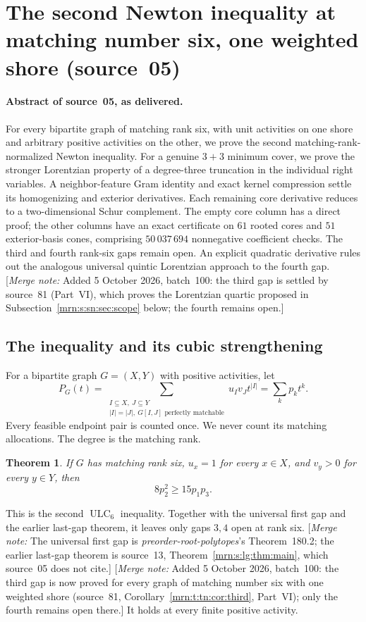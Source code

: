 \documentclass[11pt,a4paper]{article}
\newtheorem{theorem}{Theorem}[section]
\theoremstyle{remark}\newtheorem{remark}[theorem]{Remark}
\newcommand{\ULC}{\operatorname{ULC}}      %
\newcommand{\mnote}[1]{[\textit{Merge note:} #1]}
\newcommand{\prp}{\emph{preorder-root-polytopes}}
\begin{document}
\section{The second Newton inequality at matching number six, one weighted shore (source~05)}\label{mrn:src:05}
\paragraph{Abstract of source~05, as delivered.} For every bipartite graph of matching rank six, with unit activities on one shore
and arbitrary positive activities on the other, we prove the second
matching-rank-normalized Newton inequality. For a genuine $3+3$ minimum cover,
we prove the stronger Lorentzian property of a degree-three truncation in the
individual right variables. A neighbor-feature Gram identity and exact kernel
compression settle its homogenizing and exterior derivatives. Each remaining
core derivative reduces to a two-dimensional Schur complement. The empty core
column has a direct proof; the other columns have an exact certificate on
$61$ rooted cores and $51$ exterior-basis cones, comprising $50\,037\,694$
nonnegative coefficient checks. The third and fourth rank-six gaps remain open.
An explicit quadratic derivative rules out the analogous universal quintic
Lorentzian approach to the fourth gap.
\mnote{Added 5 October 2026, batch~100: the third gap is settled by source~81 (Part~VI), which
proves the Lorentzian quartic proposed in Subsection~\ref{mrn:s:sn:sec:scope}
below; the fourth remains open.}

\subsection{The inequality and its cubic strengthening}
For a bipartite graph $G=(X,Y)$ with positive activities, let
\[
 P_G(t)=\sum_{\substack{I\subseteq X,\ J\subseteq Y\\
 |I|=|J|,\ G[I,J]\text{ perfectly matchable}}}u_Iv_Jt^{|I|}
 =\sum_kp_kt^k.
\]
Every feasible endpoint pair is counted once. We never count its matching
allocations. The degree is the matching rank.

\begin{theorem}\label{mrn:s:sn:thm:main}
If $G$ has matching rank six, $u_x=1$ for every $x\in X$, and $v_y>0$ for every
$y\in Y$, then
\begin{equation}\label{mrn:s:sn:eq:gap2}
 8p_2^2\ge15p_1p_3.
\end{equation}
\end{theorem}
This is the second $\ULC_6$ inequality. Together with the universal first gap
and the earlier last-gap theorem, it leaves only gaps $3,4$ open at rank six.
\mnote{The universal first gap is \prp's Theorem~180.2; the earlier last-gap theorem is source~13, Theorem~\ref{mrn:s:lg:thm:main}, which source~05 does not cite.}
\mnote{Added 5 October 2026, batch~100: the third gap is now proved for every graph of matching number six with one weighted shore (source~81, Corollary~\ref{mrn:t:tn:cor:third}, Part~VI); only the fourth remains open there.}
It holds at every finite positive activity.
\end{document}
